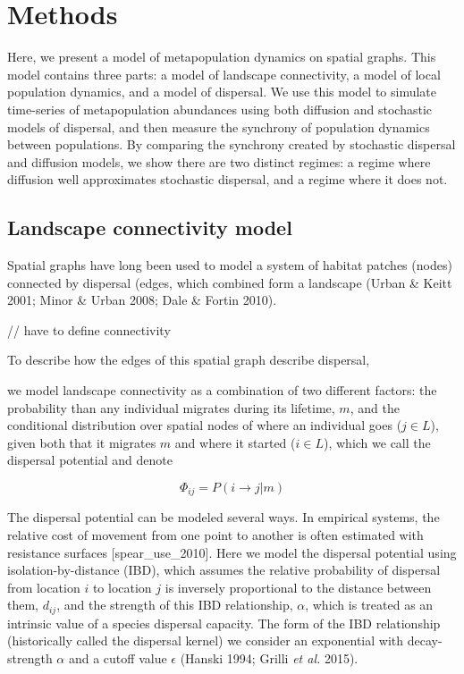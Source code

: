 \documentclass[10pt,oneside]{article}
\begin{document}
\hypertarget{methods}{%
\section{Methods}\label{methods}}

Here, we present a model of metapopulation dynamics on spatial graphs.
This model contains three parts: a model of landscape connectivity, a
model of local population dynamics, and a model of dispersal. We use
this model to simulate time-series of metapopulation abundances using
both diffusion and stochastic models of dispersal, and then measure the
synchrony of population dynamics between populations. By comparing the
synchrony created by stochastic dispersal and diffusion models, we show
there are two distinct regimes: a regime where diffusion well
approximates stochastic dispersal, and a regime where it does not.

\hypertarget{landscape-connectivity-model}{%
\subsection{Landscape connectivity
model}\label{landscape-connectivity-model}}

Spatial graphs have long been used to model a system of habitat patches
(nodes) connected by dispersal (edges, which combined form a landscape
(Urban \& Keitt 2001; Minor \& Urban 2008; Dale \& Fortin 2010).

// have to define connectivity

To describe how the edges of this spatial graph describe dispersal,

we model landscape connectivity as a combination of two different
factors: the probability than any individual migrates during its
lifetime, \(m\), and the conditional distribution over spatial nodes of
where an individual goes (\(j \in L\)), given both that it migrates
\(m\) and where it started (\(i \in L\)), which we call the dispersal
potential and denote

\[\Phi_{ij} =  P(i \to j | m)\]

The dispersal potential can be modeled several ways. In empirical
systems, the relative cost of movement from one point to another is
often estimated with resistance surfaces {[}spear\_use\_2010{]}. Here we
model the dispersal potential using isolation-by-distance (IBD), which
assumes the relative probability of dispersal from location \(i\) to
location \(j\) is inversely proportional to the distance between them,
\(d_{ij}\), and the strength of this IBD relationship, \(\alpha\), which
is treated as an intrinsic value of a species dispersal capacity. The
form of the IBD relationship (historically called the dispersal kernel)
we consider an exponential with decay-strength \(\alpha\) and a cutoff
value \(\epsilon\) (Hanski 1994; Grilli \emph{et al.} 2015).
\end{document}
